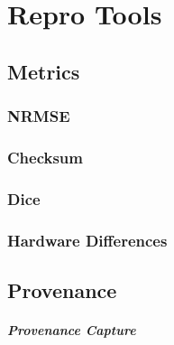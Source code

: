 \chapter{Repro Tools}


\section{Metrics}
\subsection{NRMSE}
\subsection{Checksum}
\subsection{Dice}
\subsection{Hardware Differences}

\section{Provenance}
\paragraph{Provenance Capture}




